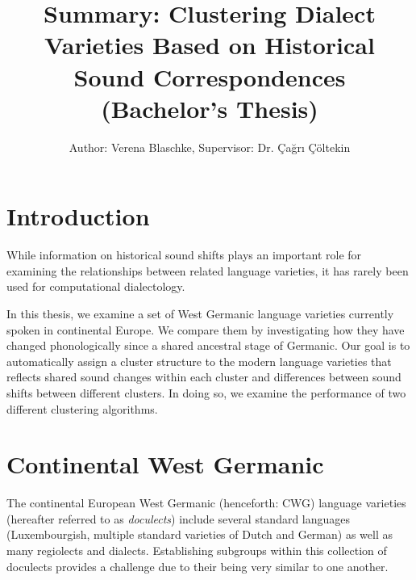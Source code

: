 \documentclass[a4paper, 11pt]{article}
\title{Summary: Clustering Dialect Varieties Based on Historical Sound Correspondences (Bachelor's Thesis)}
\date{}
\author{Author: Verena Blaschke, Supervisor: Dr. Çağrı Çöltekin}
\begin{document}

\maketitle

\section{Introduction}

While information on historical sound shifts
plays an important role for examining
the relationships between related language varieties,
it has rarely been used for computational dialectology.

In this thesis, we examine a set of West Germanic language varieties
currently spoken in continental Europe.
We compare them by investigating how they have changed phonologically
since a shared ancestral stage of Germanic.
Our goal is to automatically assign a cluster structure to the
modern language varieties that reflects shared sound changes
within each cluster and differences between sound shifts between different clusters.
In doing so, we examine the performance of two different clustering algorithms.


\section{Continental West Germanic} %

The continental European West Germanic (henceforth: CWG) language varieties 
(hereafter referred to as \textit{doculects}) include several standard languages
(Luxembourgish, multiple standard varieties of Dutch and German)
as well as many regiolects and dialects.
Establishing subgroups within this collection of doculects provides a challenge
due to their being very similar to one another.
\end{document}
